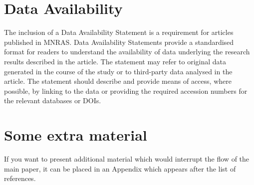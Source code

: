 \documentclass[fleqn,usenatbib]{mnras}
\begin{document}
\section*{Data Availability}

 
The inclusion of a Data Availability Statement is a requirement for articles published in MNRAS. Data Availability Statements provide a standardised format for readers to understand the availability of data underlying the research results described in the article. The statement may refer to original data generated in the course of the study or to third-party data analysed in the article. The statement should describe and provide means of access, where possible, by linking to the data or providing the required accession numbers for the relevant databases or DOIs.












\appendix

\section{Some extra material}

If you want to present additional material which would interrupt the flow of the main paper,
it can be placed in an Appendix which appears after the list of references.



\bsp	%
\label{lastpage}
\end{document}
